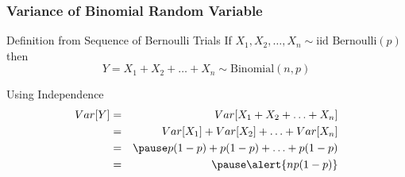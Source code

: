 \documentclass[handout]{beamer}
\begin{document}
\begin{frame}
\frametitle{Variance of Binomial Random Variable}
\begin{block}{Definition from Sequence of Bernoulli Trials}
If $X_1, X_2, \hdots, X_n \sim \mbox{iid Bernoulli}(p)$ then 
	$$Y = X_1 + X_2 + \hdots + X_n \sim \mbox{Binomial}(n,p)$$
\end{block}

\alert{Using Independence}
\begin{eqnarray*}
Var[Y] &=&  Var[X_1 + X_2 + \hdots + X_n]\\
	&=& Var[X_1] + Var[X_2] + \hdots +Var[X_n]\\
	&=&\pause p(1-p) + p(1-p) + \hdots + p(1-p)\\
	&=& \pause \alert{np(1-p)}
\end{eqnarray*}
\vspace{3em}
\end{frame}
\end{document}
